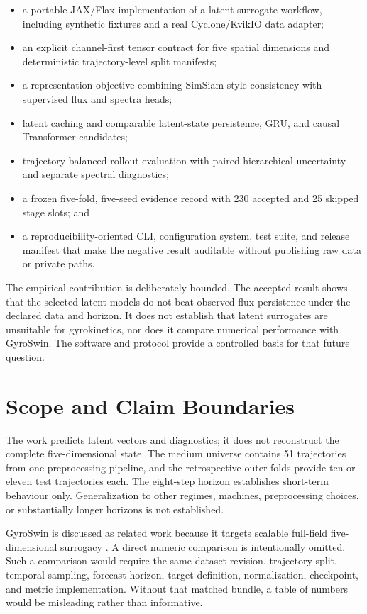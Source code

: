 \begin{itemize}
  \item a portable JAX/Flax implementation of a latent-surrogate workflow, including synthetic
        fixtures and a real Cyclone/KvikIO data adapter;
  \item an explicit channel-first tensor contract for five spatial dimensions and deterministic
        trajectory-level split manifests;
  \item a representation objective combining SimSiam-style consistency with supervised flux and
        spectra heads;
  \item latent caching and comparable latent-state persistence, GRU, and causal Transformer
        candidates;
  \item trajectory-balanced rollout evaluation with paired hierarchical uncertainty and separate
        spectral diagnostics;
  \item a frozen five-fold, five-seed evidence record with 230 accepted and 25 skipped stage slots;
        and
  \item a reproducibility-oriented CLI, configuration system, test suite, and release manifest
        that make the negative result auditable without publishing raw data or private paths.
\end{itemize}

The empirical contribution is deliberately bounded. The accepted result shows that the selected
latent models do not beat observed-flux persistence under the declared data and horizon. It does
not establish that latent surrogates are unsuitable for gyrokinetics, nor does it compare numerical
performance with GyroSwin. The software and protocol provide a controlled basis for that future
question.

\section{Scope and Claim Boundaries}

The work predicts latent vectors and diagnostics; it does not reconstruct the complete
five-dimensional state. The medium universe contains 51 trajectories from one preprocessing
pipeline, and the retrospective outer folds provide ten or eleven test trajectories each. The
eight-step horizon establishes short-term behaviour only. Generalization to other regimes,
machines, preprocessing choices, or substantially longer horizons is not established.

GyroSwin is discussed as related work because it targets scalable full-field five-dimensional
surrogacy \citep{paischer2025gyroswin}. A direct numeric comparison is intentionally omitted. Such
a comparison would require the same dataset revision, trajectory split, temporal sampling,
forecast horizon, target definition, normalization, checkpoint, and metric implementation. Without
that matched bundle, a table of numbers would be misleading rather than informative.

